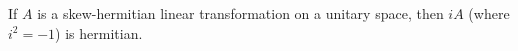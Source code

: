 If $A$ is a skew-hermitian linear transformation on a unitary space, then $iA$ (where $i^2 = -1$) is hermitian.
